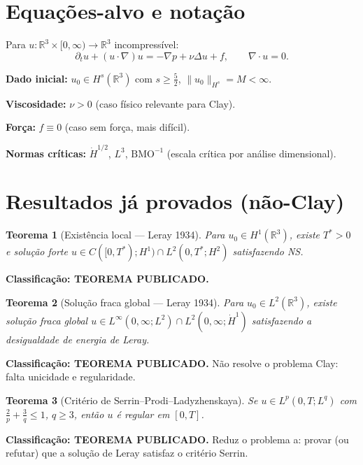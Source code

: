 \documentclass[12pt,a4paper]{article}
\newtheorem{theorem}{Teorema}
\theoremstyle{definition}
\begin{document}
\section{Equações-alvo e notação}

Para $u : \mathbb{R}^3 \times [0,\infty) \to \mathbb{R}^3$ incompressível:
\[
  \partial_t u + (u \cdot \nabla)u = -\nabla p + \nu \Delta u + f,
  \qquad \nabla \cdot u = 0.
\]

\textbf{Dado inicial:} $u_0 \in H^s(\mathbb{R}^3)$ com $s \ge \tfrac{5}{2}$,
$\|u_0\|_{H^s} = M < \infty$.

\textbf{Viscosidade:} $\nu > 0$ (caso físico relevante para Clay).

\textbf{Força:} $f \equiv 0$ (caso sem força, mais difícil).

\textbf{Normas críticas:} $\dot H^{1/2}$, $L^3$, $\mathrm{BMO}^{-1}$
(escala crítica por análise dimensional).

\section{Resultados já provados (não-Clay)}

\begin{boxproved}
\begin{theorem}[Existência local --- Leray 1934]
Para $u_0 \in H^1(\mathbb{R}^3)$, existe $T^* > 0$ e solução forte
$u \in C([0,T^*); H^1) \cap L^2(0,T^*; H^2)$ satisfazendo NS.
\end{theorem}
\textbf{Classificação: TEOREMA PUBLICADO.}
\end{boxproved}

\begin{boxproved}
\begin{theorem}[Solução fraca global --- Leray 1934]
Para $u_0 \in L^2(\mathbb{R}^3)$, existe solução fraca global
$u \in L^\infty(0,\infty; L^2) \cap L^2(0,\infty; \dot H^1)$
satisfazendo a desigualdade de energia de Leray.
\end{theorem}
\textbf{Classificação: TEOREMA PUBLICADO.}
Não resolve o problema Clay: falta unicidade e regularidade.
\end{boxproved}

\begin{boxproved}
\begin{theorem}[Critério de Serrin--Prodi--Ladyzhenskaya]
Se $u \in L^p(0,T; L^q)$ com $\frac{2}{p} + \frac{3}{q} \le 1$,
$q \ge 3$, então $u$ é regular em $[0,T]$.
\end{theorem}
\textbf{Classificação: TEOREMA PUBLICADO.}
Reduz o problema a: provar (ou refutar) que a solução de Leray
satisfaz o critério Serrin.
\end{boxproved}
\end{document}
